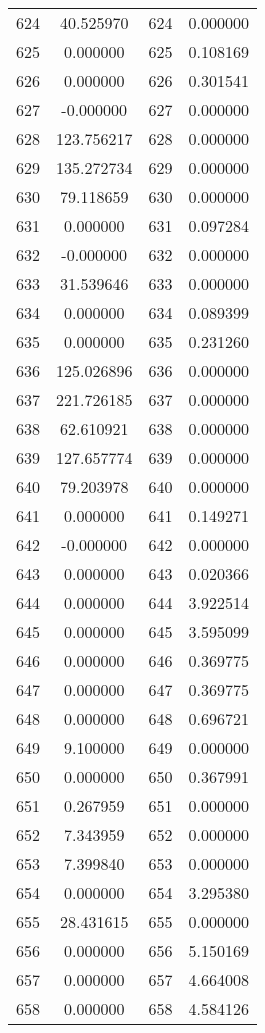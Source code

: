 \documentclass[12pt]{article}
\begin{document}
\begin{longtable}{@{}cccc@{}}
624 & 40.525970 & 624 & 0.000000 \\
625 & 0.000000 & 625 & 0.108169 \\
626 & 0.000000 & 626 & 0.301541 \\
627 & -0.000000 & 627 & 0.000000 \\
628 & 123.756217 & 628 & 0.000000 \\
629 & 135.272734 & 629 & 0.000000 \\
630 & 79.118659 & 630 & 0.000000 \\
631 & 0.000000 & 631 & 0.097284 \\
632 & -0.000000 & 632 & 0.000000 \\
633 & 31.539646 & 633 & 0.000000 \\
634 & 0.000000 & 634 & 0.089399 \\
635 & 0.000000 & 635 & 0.231260 \\
636 & 125.026896 & 636 & 0.000000 \\
637 & 221.726185 & 637 & 0.000000 \\
638 & 62.610921 & 638 & 0.000000 \\
639 & 127.657774 & 639 & 0.000000 \\
640 & 79.203978 & 640 & 0.000000 \\
641 & 0.000000 & 641 & 0.149271 \\
642 & -0.000000 & 642 & 0.000000 \\
643 & 0.000000 & 643 & 0.020366 \\
644 & 0.000000 & 644 & 3.922514 \\
645 & 0.000000 & 645 & 3.595099 \\
646 & 0.000000 & 646 & 0.369775 \\
647 & 0.000000 & 647 & 0.369775 \\
648 & 0.000000 & 648 & 0.696721 \\
649 & 9.100000 & 649 & 0.000000 \\
650 & 0.000000 & 650 & 0.367991 \\
651 & 0.267959 & 651 & 0.000000 \\
652 & 7.343959 & 652 & 0.000000 \\
653 & 7.399840 & 653 & 0.000000 \\
654 & 0.000000 & 654 & 3.295380 \\
655 & 28.431615 & 655 & 0.000000 \\
656 & 0.000000 & 656 & 5.150169 \\
657 & 0.000000 & 657 & 4.664008 \\
658 & 0.000000 & 658 & 4.584126 \\

\end{longtable}
\end{document}
